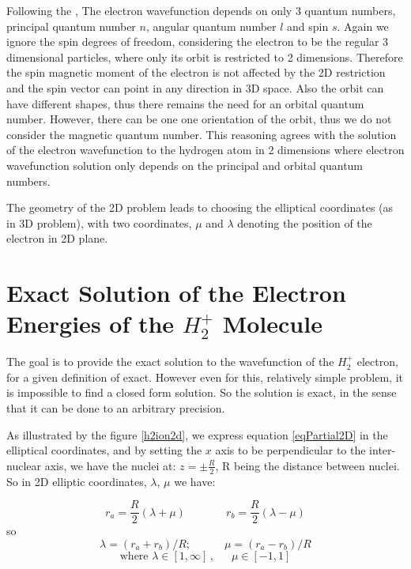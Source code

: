 Following the \cite{2DHAtom}, The electron wavefunction depends on only 3 quantum numbers, principal quantum number $ n $, angular quantum number $ l $ and spin $ s $. Again we ignore the spin degrees of freedom, considering the electron to be the regular 3 dimensional particles, where only its orbit is restricted to 2 dimensions.  Therefore the spin magnetic moment of the electron is not affected by the 2D restriction and the spin vector can point in any direction in 3D space. Also the orbit can have different shapes, thus there remains the need for an orbital quantum number. However, there can be one one orientation of the orbit, thus we do not consider the magnetic quantum number. This reasoning agrees with the solution of the electron wavefunction to the hydrogen atom in 2 dimensions \cite{H2atom} where electron wavefunction solution only depends on the principal and orbital quantum numbers.

The geometry of the 2D problem leads to choosing the elliptical coordinates (as in 3D problem), with two coordinates, $ \mu $ and $ \lambda $ denoting the position of the electron in 2D plane. \cite{Arfken}

\section{Exact Solution of the Electron Energies of the \texorpdfstring{$ H_2^+ $}{$H_2^+$} Molecule}

The goal is to provide the exact solution to the wavefunction of the $ H_2^{+} $ electron, for a given definition of exact. However even for this, relatively simple problem, it is impossible to find a closed form solution. So the solution is exact, in the sense that it can be done to an arbitrary precision.

As illustrated by the figure  \ref{h2ion2d}, we express equation \eqref{eqPartial2D} in the elliptical coordinates, and by setting the $ x $ axis to be perpendicular to the inter-nuclear axis, we have the nuclei at: $ z = \pm \frac{R}{2}  $, R being the distance between nuclei. So in  2D elliptic coordinates, $ \lambda $, $ \mu $ we have:

\begin{equation}\label{variables1}
r_a = \frac{R}{2}\left(\lambda + \mu \right)\,\,\,\,\,\,\,\,\,\,\,\,\,\,\,\,\,\,\,\,\,\, r_b = \frac{R}{2}\left(\lambda - \mu \right)
\end{equation}
so
\begin{equation}\label{variables1a}
\lambda = \left(r_a + r_b\right)/R;\,\,\,\,\,\,\,\,\,\,\,\,\,\,\,\,\,\,\mu =  \left(r_a - r_b\right)/R
\end{equation}
\begin{equation}
\text{where } \lambda \in \left[1,\infty\right]\,,\,\,\,\,\,\,\,\,\,\mu \in \left[ -1, 1 \right]
\end{equation}

